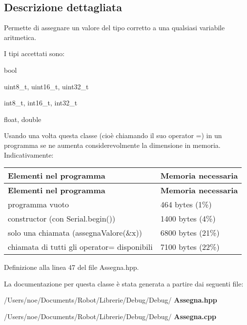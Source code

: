 \subsection{Descrizione dettagliata}
Permette di assegnare un valore del tipo corretto a una qualsiasi variabile aritmetica. 

I tipi accettati sono\+:


\begin{DoxyItemize}
\item {\ttfamily bool}
\item {\ttfamily uint8\+\_\+t}, {\ttfamily uint16\+\_\+t}, {\ttfamily uint32\+\_\+t}
\item {\ttfamily int8\+\_\+t}, {\ttfamily int16\+\_\+t}, {\ttfamily int32\+\_\+t}
\item {\ttfamily float}, {\ttfamily double}
\end{DoxyItemize}

Usando una volta questa classe (cioè chiamando il suo {\ttfamily operator =}) in un programma se ne aumenta considerevolmente la dimensione in memoria. Indicativamente\+:

\tabulinesep=1mm
\begin{longtabu} spread 0pt [c]{*{2}{|X[-1]}|}
\hline
\rowcolor{\tableheadbgcolor}\textbf{ Elementi nel programma  }&\textbf{ Memoria necessaria   }\\
\endfirsthead
\hline
\endfoot
\hline
\rowcolor{\tableheadbgcolor}\textbf{ Elementi nel programma  }&\textbf{ Memoria necessaria   }\\
\endhead
programma vuoto  &464 bytes (1\%)   \\
constructor (con Serial.\+begin())  &1400 bytes (4\%)   \\
solo una chiamata (assegna\+Valore(\&x))  &6800 bytes (21\%)   \\
chiamata di tutti gli operator= disponibili  &7100 bytes (22\%)   \\
\end{longtabu}


Definizione alla linea 47 del file Assegna.\+hpp.



La documentazione per questa classe è stata generata a partire dai seguenti file\+:\begin{DoxyCompactItemize}
\item 
/\+Users/noe/\+Documents/\+Robot/\+Librerie/\+Debug/\+Debug/\textbf{ Assegna.\+hpp}\item 
/\+Users/noe/\+Documents/\+Robot/\+Librerie/\+Debug/\+Debug/\textbf{ Assegna.\+cpp}\end{DoxyCompactItemize}
